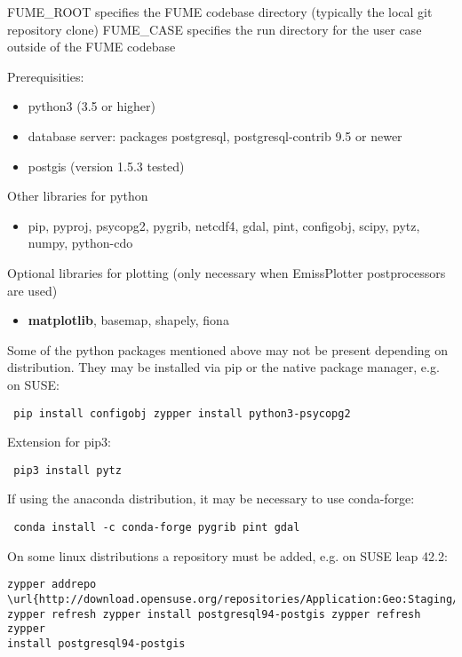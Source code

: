 \documentclass[a4paper,11pt]{article}
\begin{document}
FUME\_ROOT specifies the FUME codebase directory (typically the local
git repository clone) FUME\_CASE specifies the run directory for the
user case outside of the FUME codebase

Prerequisities:

\begin{itemize}
\item
  python3 (3.5 or higher)
\item
  database server: packages postgresql, postgresql-contrib 9.5 or newer
\item
  postgis (version 1.5.3 tested)
\end{itemize}

Other libraries for python

\begin{itemize}
\item
  pip, pyproj, psycopg2, pygrib, netcdf4, gdal, pint, configobj, scipy,
  pytz, numpy, python-cdo
\end{itemize}

Optional libraries for plotting (only necessary when EmissPlotter
postprocessors are used)

\begin{itemize}
\item
  \textbf{matplotlib}, basemap, shapely, fiona
\end{itemize}

Some of the python packages mentioned above may not be present depending
on distribution. They may be installed via pip or the native package
manager, e.g. on SUSE:

\begin{verbatim}
 pip install configobj zypper install python3-psycopg2
\end{verbatim}

Extension for pip3: 

\begin{verbatim}
 pip3 install pytz
\end{verbatim}

If using the anaconda distribution, it may be necessary to use
conda-forge:

\begin{verbatim}
 conda install -c conda-forge pygrib pint gdal
\end{verbatim}

On some linux distributions a repository must be added, e.g. on SUSE
leap 42.2:

\begin{verbatim}
zypper addrepo
\url{http://download.opensuse.org/repositories/Application:Geo:Staging/openSUSE_Leap_42.2/Application:Geo:Staging.repo}
zypper refresh zypper install postgresql94-postgis zypper refresh zypper
install postgresql94-postgis
\end{verbatim}
\end{document}
